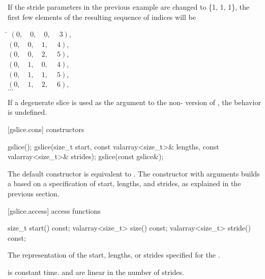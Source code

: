 \pnum
\begin{example}
If the stride parameters in the previous
example are changed to \{1, 1, 1\}, the first few elements of the
resulting sequence of indices will be

\begin{tabbing}
\hspace{.9in}\=\kill%
\>$(0,\quad 0,\quad 0,\quad \ 3)$,  \\
\>$(0,\quad 0,\quad 1,\quad \ 4)$,  \\
\>$(0,\quad 0,\quad 2,\quad \ 5)$,  \\
\>$(0,\quad 1,\quad 0,\quad \ 4)$,  \\
\>$(0,\quad 1,\quad 1,\quad \ 5)$,  \\
\>$(0,\quad 1,\quad 2,\quad \ 6)$,  \\
\>$\ldots$
\end{tabbing}
\end{example}

\pnum
If a degenerate slice is used as the argument to the
non-
version of
,
the behavior is undefined.
%

[gslice.cons]{ constructors}

%
\begin{itemdecl}
gslice();
gslice(size_t start, const valarray<size_t>& lengths,
         const valarray<size_t>& strides);
gslice(const gslice&);
\end{itemdecl}

\begin{itemdescr}
\pnum
The default constructor is equivalent to
.
The constructor with arguments builds a
based on a specification of start, lengths, and strides, as explained
in the previous section.
\end{itemdescr}

[gslice.access]{ access functions}

%
%
%
\begin{itemdecl}
size_t           start()  const;
valarray<size_t> size() const;
valarray<size_t> stride() const;
\end{itemdecl}

\begin{itemdescr}
\pnum
\returns The representation of the
start, lengths, or strides specified for the .

\pnum
\complexity {} is constant time.  and 
are linear in the number of strides.
\end{itemdescr}

